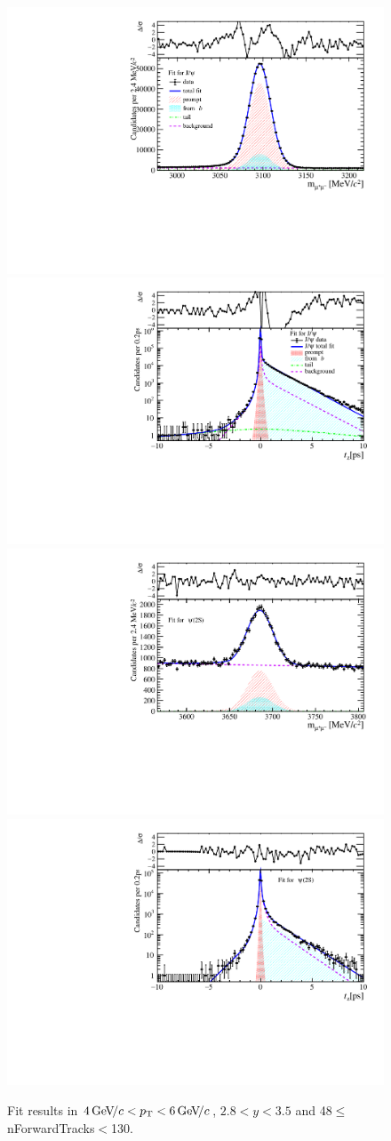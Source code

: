 \begin{figure}[H]
\begin{center}
\includegraphics[width=0.47\linewidth]{pdf/Jpsi/drawmassF/n5y2pt3.pdf}
\includegraphics[width=0.47\linewidth]{pdf/Jpsi/2DFitF/n5y2pt3.pdf}
\vspace*{-0.5cm}
\includegraphics[width=0.47\linewidth]{pdf/Psi2S/drawmassF/n5y2pt3.pdf}
\includegraphics[width=0.47\linewidth]{pdf/Psi2S/2DFitF/n5y2pt3.pdf}
\vspace*{-0.5cm}
\end{center}
\caption{Fit results in $4\text{\,Ge\kern -0.1em V\!/}c<p_{\mathrm{T}}<6\text{\,Ge\kern -0.1em V\!/}c$, $2.8<y<3.5$ and 48$\leq$nForwardTracks$<$130.}
\label{Fitn5y2pt3}
\end{figure}
